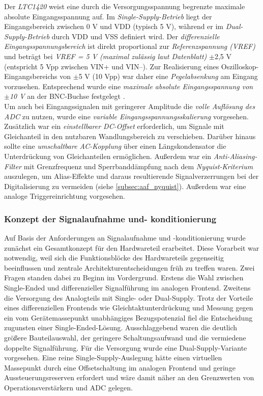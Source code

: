 \documentclass[a4paper, portrait, 12pt]{scrartcl} %
\begin{document}
Der \emph{LTC1420} weist eine durch die Versorgungsspannung begrenzte maximale absolute Eingangsspannung auf. Im \emph{Single-Supply-Betrieb} liegt der Eingangsbereich zwischen 0 V und VDD (typisch 5 V), während er im \emph{Dual-Supply-Betrieb} durch VDD und VSS definiert wird. Der \emph{differenzielle Eingangsspannungsbereich} ist direkt proportional zur \emph{Referenzspannung (VREF)} und beträgt bei \emph{VREF = 5 V (maximal zulässig laut Datenblatt)} $\pm$2,5 V (entspricht 5 Vpp zwischen VIN+ und VIN–). Zur Realisierung eines Oszilloskop-Eingangsbereichs von $\pm$5 V (10 Vpp) war daher eine \emph{Pegelabsenkung} am Eingang vorzusehen. Entsprechend wurde eine \emph{maximale absolute Eingangsspannung von $\pm$10 V} an der BNC-Buchse festgelegt \cite[S. 1f]{LinearTechnology1420}.\\

Um auch bei Eingangssignalen mit geringerer Amplitude die \emph{volle Auflösung des ADC} zu nutzen, wurde eine \emph{variable Eingangsspannungsskalierung} vorgesehen. Zusätzlich war ein \emph{einstellbarer DC-Offset} erforderlich, um Signale mit Gleichanteil in den nutzbaren Wandlungsbereich zu verschieben. Darüber hinaus sollte eine \emph{umschaltbare AC-Kopplung} über einen Längskondensator die Unterdrückung von Gleichanteilen ermöglichen. Außerdem war ein \emph{Anti-Aliasing-Filter} mit Grenzfrequenz und Sperrbanddämpfung nach dem \emph{Nyquist-Kriterium} auszulegen, um Alias-Effekte und daraus resultierende Signalverzerrungen bei der Digitalisierung zu vermeiden (siehe \autoref{subsec:aaf_nyquist}). Außerdem war eine analoge Triggereinrichtung vorgesehen.

\subsubsection{Konzept der Signalaufnahme und- konditionierung}

Auf Basis der Anforderungen an Signalaufnahme und -konditionierung wurde zunächst ein Gesamtkonzept für den Hardwareteil erarbeitet. Diese Vorarbeit war notwendig, weil sich die Funktionsblöcke des Hardwareteils gegenseitig beeinflussen und zentrale Architekturentscheidungen früh zu treffen waren. Zwei Fragen standen dabei zu Beginn im Vordergrund. Erstens die Wahl zwischen Single-Ended und differenzieller Signalführung im analogen Frontend. Zweitens die Versorgung des Analogteils mit Single- oder Dual-Supply. Trotz der Vorteile eines differenziellen Frontends wie Gleichtaktunterdrückung und Messung gegen ein vom Gerätemassepunkt unabhängiges Bezugspotenzial fiel die Entscheidung zugunsten einer Single-Ended-Lösung. Ausschlaggebend waren die deutlich größere Bauteilauswahl, der geringere Schaltungsaufwand und die vermiedene doppelte Signalführung. Für die Versorgung wurde eine Dual-Supply-Variante vorgesehen. Eine reine Single-Supply-Auslegung hätte einen virtuellen Massepunkt durch eine Offsetschaltung im analogen Frontend und geringe Aussteuerungsreserven erfordert und wäre damit näher an den Grenzwerten von Operationsverstärkern und ADC gelegen.\\
\end{document}
